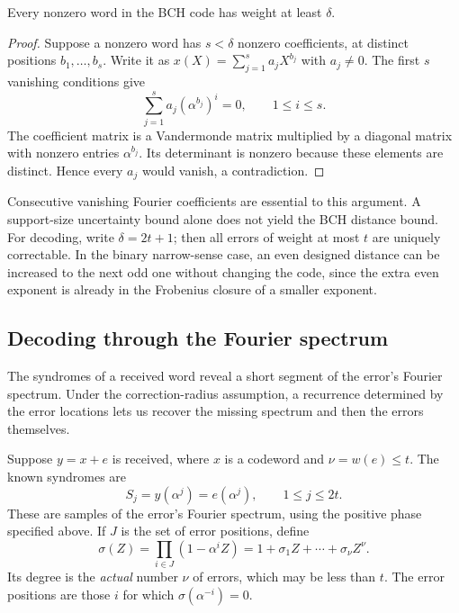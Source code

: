 
\begin{prop}
\label{prop-dist-minimal-code-bch}
Every nonzero word in the BCH code has weight at least $\delta$.
\end{prop}
\begin{proof}
Suppose a nonzero word has $s<\delta$ nonzero coefficients, at distinct
positions $b_1,\ldots,b_s$. Write it as
$x(X)=\sum_{j=1}^s a_jX^{b_j}$ with $a_j\ne0$. The first $s$ vanishing
conditions give
\[
 \sum_{j=1}^s a_j(\alpha^{b_j})^i=0,\qquad 1\leq i\leq s.
\]
The coefficient matrix is a Vandermonde matrix multiplied by a diagonal
matrix with nonzero entries $\alpha^{b_j}$. Its determinant is nonzero
because these elements are distinct. Hence every $a_j$ would vanish,
a contradiction.
\end{proof}
Consecutive vanishing Fourier coefficients are essential to this argument.
A support-size uncertainty bound alone does not yield the BCH distance
bound. For decoding, write $\delta=2t+1$; then all errors of weight at
most $t$ are uniquely correctable. In the binary narrow-sense case, an
even designed distance can be increased to the next odd one without
changing the code, since the extra even exponent is already in the
Frobenius closure of a smaller exponent.

\subsection{Decoding through the Fourier spectrum}
\label{sect2-decodage-bch}

The syndromes of a received word reveal a short segment of the error's
Fourier spectrum. Under the correction-radius assumption, a recurrence
determined by the error locations lets us recover the missing spectrum and
then the errors themselves.

Suppose $y=x+e$ is received, where $x$ is a codeword and
$\nu=w(e)\leq t$. The known syndromes are
\[
 S_j=y(\alpha^j)=e(\alpha^j),\qquad 1\leq j\leq2t.
\]
These are samples of the error's Fourier spectrum, using the positive
phase specified above. If $J$ is the set of error positions, define
\[
 \sigma(Z)=\prod_{i\in J}(1-\alpha^iZ)
          =1+\sigma_1Z+\cdots+\sigma_\nu Z^\nu.
\]
Its degree is the \emph{actual} number $\nu$ of errors, which may be less
than $t$. The error positions are those $i$ for which
$\sigma(\alpha^{-i})=0$.


